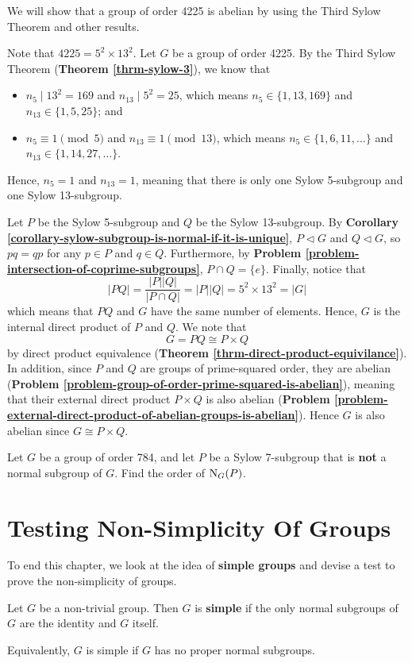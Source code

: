 \begin{example}
    We will show that a group of order 4225 is abelian by using the Third Sylow Theorem and other results.

    Note that $4225 = 5^2 \times 13^2$. Let $G$ be a group of order 4225. By the Third Sylow Theorem (\textbf{Theorem \ref{thrm-sylow-3}}), we know that
    \begin{itemize}
        \item $n_5 \mid 13^2 = 169$ and $n_{13} \mid 5^2 = 25$, which means $n_5 \in \{1, 13, 169\}$ and $n_{13} \in \{1, 5, 25\}$; and
        \item $n_5 \equiv 1 \pmod 5$ and $n_{13} \equiv 1 \pmod{13}$, which means $n_5 \in \{1, 6, 11, \dots\}$ and $n_{13} \in \{1, 14, 27, \dots\}$.
    \end{itemize}
    Hence, $n_5 = 1$ and $n_{13} = 1$, meaning that there is only one Sylow 5-subgroup and one Sylow 13-subgroup.

    Let $P$ be the Sylow 5-subgroup and $Q$ be the Sylow 13-subgroup. By \textbf{Corollary \ref{corollary-sylow-subgroup-is-normal-if-it-is-unique}}, $P \lhd G$ and $Q \lhd G$, so $pq = qp$ for any $p \in P$ and $q \in Q$. Furthermore, by \textbf{Problem \ref{problem-intersection-of-coprime-subgroups}}, $P \cap Q = \{e\}$. Finally, notice that
    \[
        |PQ| = \frac{|P||Q|}{|P\cap Q|} = |P||Q| = 5^2\times13^2 = |G|
    \]
    which means that $PQ$ and $G$ have the same number of elements. Hence, $G$ is the internal direct product of $P$ and $Q$. We note that
    \[
        G = PQ \cong P\times Q
    \]
    by direct product equivalence (\textbf{Theorem \ref{thrm-direct-product-equivilance}}). In addition, since $P$ and $Q$ are groups of prime-squared order, they are abelian (\textbf{Problem \ref{problem-group-of-order-prime-squared-is-abelian}}), meaning that their external direct product $P\times Q$ is also abelian (\textbf{Problem \ref{problem-external-direct-product-of-abelian-groups-is-abelian}}). Hence $G$ is also abelian since $G \cong P \times Q$.
\end{example}

\begin{exercise}
    Let $G$ be a group of order 784, and let $P$ be a Sylow 7-subgroup that is \textbf{not} a normal subgroup of $G$. Find the order of $\mathrm{N}_{G}(P)$.
\end{exercise}

\section{Testing Non-Simplicity Of Groups}
To end this chapter, we look at the idea of \textbf{simple groups} and devise a test to prove the non-simplicity of groups.
\begin{definition}
    Let $G$ be a non-trivial group. Then $G$ is \textbf{simple} if the only normal subgroups of $G$ are the identity and $G$ itself.
\end{definition}
\begin{remark}
    Equivalently, $G$ is simple if $G$ has no proper normal subgroups.
\end{remark}

